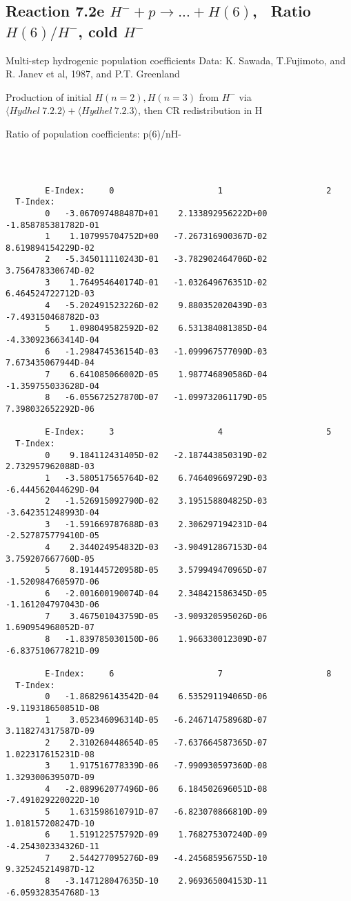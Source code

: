 \documentclass[12pt,dvipdfmx]{article}
\begin{document}
\subsection{
Reaction 7.2e $ H^- + p \rightarrow ...+ H(6) $, \   Ratio $H(6)/H^- $, cold $H^-$
}
 Multi-step hydrogenic population coefficients
 Data: K. Sawada, T.Fujimoto, \cite{kn:Sawada} and R. Janev et al, 1987, and P.T. Greenland

Production of initial $H(n=2), H(n=3)$ from $H^-$ via $ \langle Hydhel~ 7.2.2\rangle + \langle Hydhel~ 7.2.3\rangle$,
 then CR redistribution in H

 Ratio of population coefficients: p(6)/nH-



\begin{small}\begin{verbatim}



        E-Index:     0                     1                     2
  T-Index:
        0   -3.067097488487D+01    2.133892956222D+00   -1.858785381782D-01
        1    1.107995704752D+00   -7.267316900367D-02    8.619894154229D-02
        2   -5.345011110243D-01   -3.782902464706D-02    3.756478330674D-02
        3    1.764954640174D-01   -1.032649676351D-02    6.464524722712D-03
        4   -5.202491523226D-02    9.880352020439D-03   -7.493150468782D-03
        5    1.098049582592D-02    6.531384081385D-04   -4.330923663414D-04
        6   -1.298474536154D-03   -1.099967577090D-03    7.673435067944D-04
        7    6.641085066002D-05    1.987746890586D-04   -1.359755033628D-04
        8   -6.055672527870D-07   -1.099732061179D-05    7.398032652292D-06

        E-Index:     3                     4                     5
  T-Index:
        0    9.184112431405D-02   -2.187443850319D-02    2.732957962088D-03
        1   -3.580517565764D-02    6.746409669729D-03   -6.444562044629D-04
        2   -1.526915092790D-02    3.195158804825D-03   -3.642351248993D-04
        3   -1.591669787688D-03    2.306297194231D-04   -2.527875779410D-05
        4    2.344024954832D-03   -3.904912867153D-04    3.759207667760D-05
        5    8.191445720958D-05    3.579949470965D-07   -1.520984760597D-06
        6   -2.001600190074D-04    2.348421586345D-05   -1.161204797043D-06
        7    3.467501043759D-05   -3.909320595026D-06    1.690954968052D-07
        8   -1.839785030150D-06    1.966330012309D-07   -6.837510677821D-09

        E-Index:     6                     7                     8
  T-Index:
        0   -1.868296143542D-04    6.535291194065D-06   -9.119318650851D-08
        1    3.052346096314D-05   -6.246714758968D-07    3.118274317587D-09
        2    2.310260448654D-05   -7.637664587365D-07    1.022317615231D-08
        3    1.917516778339D-06   -7.990930597360D-08    1.329300639507D-09
        4   -2.089962077496D-06    6.184502696051D-08   -7.491029220022D-10
        5    1.631598610791D-07   -6.823070866810D-09    1.018157208247D-10
        6    1.519122575792D-09    1.768275307240D-09   -4.254302334326D-11
        7    2.544277095276D-09   -4.245685956755D-10    9.325245214987D-12
        8   -3.147128047635D-10    2.969365004153D-11   -6.059328354768D-13


\end{verbatim}
\end{small}
\end{document}
